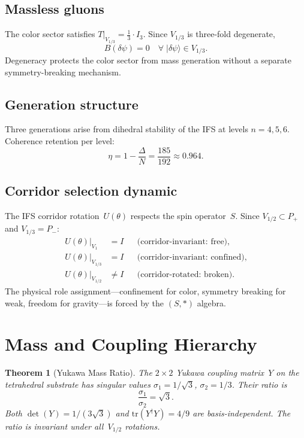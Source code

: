 \documentclass[%
 aip,
 amsmath,amssymb,
 reprint,%
]{revtex4-1}
\newtheorem{theorem}{Theorem}
\newcommand{\third}{\tfrac{1}{3}}
\newcommand{\Vone}{V_1}
\newcommand{\Vhalf}{V_{1/2}}
\newcommand{\Vthird}{V_{1/3}}
\newcommand{\Pp}{P_+}
\newcommand{\Pm}{P_-}
\begin{document}
\subsection{\label{ssec:gluons}Massless gluons}

The color sector satisfies $T|_{\Vthird}=\third\cdot I_3$. Since $\Vthird$ is three-fold degenerate,
\begin{equation}\label{eq:massless}
B(\delta\psi)=0\quad\forall\;|\delta\psi\rangle\in\Vthird.
\end{equation}
Degeneracy protects the color sector from mass generation without a separate symmetry-breaking mechanism.

\subsection{\label{ssec:gen}Generation structure}

Three generations arise from dihedral stability of the IFS at levels $n=4,5,6$. Coherence retention per level:
\begin{equation}\label{eq:eta}
\eta=1-\frac{\Delta}{N}=\frac{185}{192}\approx0.964.
\end{equation}

\subsection{\label{ssec:corridor}Corridor selection dynamic}

The IFS corridor rotation~$U(\theta)$ respects the spin operator~$S$. Since $\Vhalf\subset\Pp$ and $\Vthird=\Pm$:
\begin{align}
U(\theta)\big|_{\Vone}&=I &&\text{(corridor-invariant: free)}, \label{eq:corr_V1}\\
U(\theta)\big|_{\Vthird}&=I &&\text{(corridor-invariant: confined)}, \label{eq:corr_V13}\\
U(\theta)\big|_{\Vhalf}&\neq I &&\text{(corridor-rotated: broken)}. \label{eq:corr_V12}
\end{align}
The physical role assignment---confinement for color, symmetry breaking for weak, freedom for gravity---is forced by the $(S,*)$ algebra.


\section{\label{sec:mass}Mass and Coupling Hierarchy}

\begin{theorem}[Yukawa Mass Ratio]\label{thm:yukawa}
The $2\times2$ Yukawa coupling matrix~$Y$ on the tetrahedral substrate has singular values $\sigma_1=1/\sqrt{3}$, $\sigma_2=1/3$. Their ratio is
\begin{equation}\label{eq:yukawa_ratio}
\frac{\sigma_1}{\sigma_2}=\sqrt{3}.
\end{equation}
Both $\det(Y)=1/(3\sqrt{3})$ and $\mathrm{tr}(Y^\dagger Y)=4/9$ are basis-independent. The ratio is invariant under all~$\Vhalf$ rotations.
\end{theorem}
\end{document}
